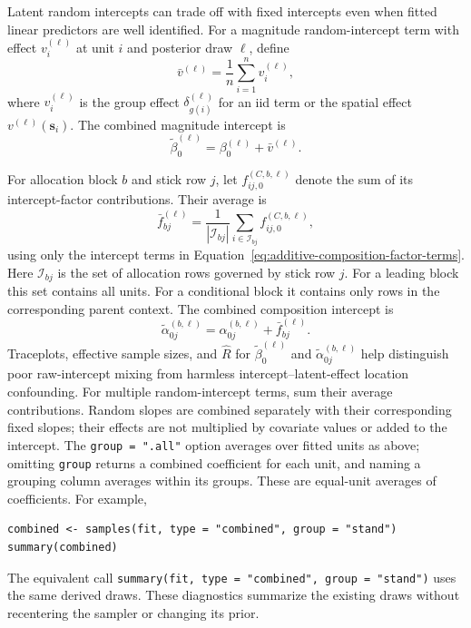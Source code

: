 \documentclass[11pt]{article}
\newcommand{\bs}{\bm{s}}
\begin{document}
Latent random intercepts can trade off with fixed intercepts even when fitted
linear predictors are well identified. For a magnitude random-intercept term
with effect \(v_i^{(\ell)}\) at unit \(i\) and posterior draw \(\ell\), define
\begin{equation}
  \bar v^{(\ell)}
  =
  \frac{1}{n}\sum_{i=1}^{n} v_i^{(\ell)},
  \label{eq:magnitude-average-process}
\end{equation}
where \(v_i^{(\ell)}\) is the group effect \(\delta_{g(i)}^{(\ell)}\)
for an iid term or the spatial effect \(v^{(\ell)}(\bs_i)\).
The combined magnitude intercept is
\begin{equation}
  \tilde{\beta}_0^{(\ell)}
  =
  \beta_0^{(\ell)}+\bar v^{(\ell)}.
  \label{eq:additive-magnitude-intercept}
\end{equation}

For allocation block \(b\) and stick row \(j\), let
\(f_{ij,0}^{(C,b,\ell)}\) denote the sum of its intercept-factor contributions.
Their average is
\begin{equation}
  \bar f_{bj}^{(\ell)}
  =
  \frac{1}{|\mathcal{I}_{bj}|}
  \sum_{i\in\mathcal{I}_{bj}}
  f_{ij,0}^{(C,b,\ell)},
  \label{eq:composition-average-factor}
\end{equation}
using only the intercept terms in
Equation~\ref{eq:additive-composition-factor-terms}.
Here \(\mathcal{I}_{bj}\) is the set of allocation rows governed by stick
row \(j\). For a leading block this set contains all units. For a conditional
block it contains only rows in the corresponding parent context. The combined
composition intercept is
\begin{equation}
  \tilde{\alpha}_{0j}^{(b,\ell)}
  =
  \alpha_{0j}^{(b,\ell)}+\bar f_{bj}^{(\ell)}.
  \label{eq:additive-composition-intercept}
\end{equation}
Traceplots, effective sample sizes, and \(\widehat{R}\) for
\(\tilde{\beta}_0^{(\ell)}\) and \(\tilde{\alpha}_{0j}^{(b,\ell)}\) help distinguish
poor raw-intercept mixing from harmless intercept--latent-effect location
confounding.
For multiple random-intercept terms, sum their average contributions.
Random slopes are combined separately with their corresponding fixed slopes;
their effects are not multiplied by covariate values or added to the intercept.
The \texttt{group = ".all"} option averages over fitted units as above;
omitting \texttt{group} returns a combined coefficient for each unit, and
naming a grouping column averages within its groups. These are equal-unit
averages of coefficients. For example,
\begin{verbatim}
combined <- samples(fit, type = "combined", group = "stand")
summary(combined)
\end{verbatim}
The equivalent call \texttt{summary(fit, type = "combined", group = "stand")}
uses the same derived draws. These diagnostics summarize the existing draws
without recentering the sampler or changing its prior.
\end{document}
